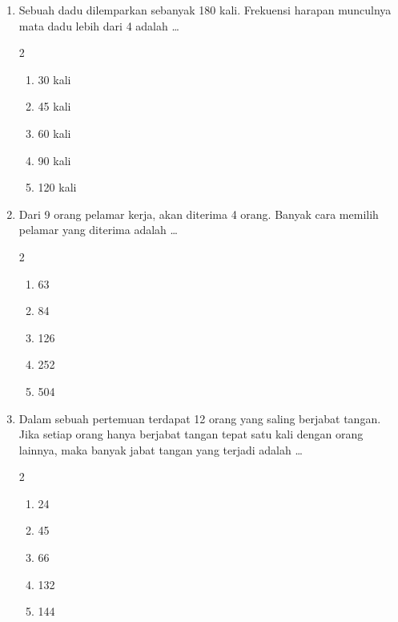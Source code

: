 \documentclass[12pt,a4paper]{article}
\begin{document}
\begin{enumerate}[itemsep=2ex]
    \item Sebuah dadu dilemparkan sebanyak 180 kali. Frekuensi harapan munculnya mata dadu lebih dari 4 adalah \dots
    \begin{multicols}{2}
    \begin{enumerate}[label=\Alph*.]
        \item 30 kali
        \item 45 kali
        \item 60 kali
        \item 90 kali
        \item 120 kali
    \end{enumerate}
    \end{multicols}

    \item Dari 9 orang pelamar kerja, akan diterima 4 orang. Banyak cara memilih pelamar yang diterima adalah \dots
    \begin{multicols}{2}
    \begin{enumerate}[label=\Alph*.]
        \item 63
        \item 84
        \item 126
        \item 252
        \item 504
    \end{enumerate}
    \end{multicols}

    \item Dalam sebuah pertemuan terdapat 12 orang yang saling berjabat tangan. Jika setiap orang hanya berjabat tangan tepat satu kali dengan orang lainnya, maka banyak jabat tangan yang terjadi adalah \dots
    \begin{multicols}{2}
    \begin{enumerate}[label=\Alph*.]
        \item 24
        \item 45
        \item 66
        \item 132
        \item 144
    \end{enumerate}
    \end{multicols}

\end{enumerate}
\end{document}
